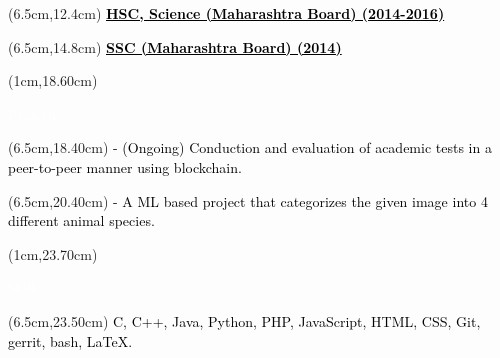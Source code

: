 \documentclass[10pt,a4paper,twocolumn]{article}
\begin{document}
\begin{textblock*}{14cm}(6.5cm,12.4cm)
   \textcolor{black}{\fontsize{15}{20}\selectfont \underline{\textbf{HSC, Science (Maharashtra Board)\hspace{25mm} (2014-2016)}}\vspace{2mm} }
\end{textblock*}
\begin{textblock*}{14cm}(6.5cm,14.8cm)
   \textcolor{black}{\fontsize{15}{20}\selectfont \underline{\textbf{SSC (Maharashtra Board) \hspace{6cm} (2014)}}\vspace{2mm} }
\end{textblock*}
\begin{textblock*}{3.5cm}(1cm,18.60cm)
   \begin{mdframed}[style=Frame1]
   \textcolor{white}{\fontsize{20}{20}\selectfont Projects}
   \end{mdframed}
\end{textblock*}
\begin{textblock*}{14cm}(6.5cm,18.40cm)
   \textcolor{black}{\fontsize{15}{20}\selectfont  {1] Secured e-Assessment using blockchain: } \vspace{3mm}
   \newline- (Ongoing) Conduction and evaluation of academic tests in a peer-to-peer manner using blockchain.}
\end{textblock*}
\begin{textblock*}{14cm}(6.5cm,20.40cm)
   \textcolor{black}{\fontsize{15}{20}\selectfont  {2] Image Classifier using tensorflow: } \vspace{3mm}
   \newline- A ML based project that categorizes the given image into 4 different animal species.}
\end{textblock*}
\begin{textblock*}{2.5cm}(1cm,23.70cm)
   \begin{mdframed}[style=Frame1]
   \textcolor{white}{\fontsize{20}{20}\selectfont Skills}
   \end{mdframed}
\end{textblock*}
\begin{textblock*}{14cm}(6.5cm,23.50cm)
   \textcolor{black}{\fontsize{15}{20}\selectfont  {1] Good grasp of following \vspace{1mm}programming languages and technologies:}\vspace{1mm} C, C++, Java, Python, PHP, JavaScript, HTML, CSS, Git, gerrit, bash, LaTeX.}
\end{textblock*}
\end{document}
